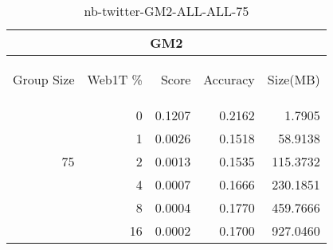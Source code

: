 \begin{center}
\begin{table}[htbp]
\begin{tabular}{ | r | r | r | r | r |}
\hline
\multicolumn{5}{|c|}{GM2}\\
\hline
\begin{sideways}Group Size\end{sideways} & \begin{sideways}Web1T \%\end{sideways} & \begin{sideways}Score\end{sideways} & \begin{sideways}Accuracy\end{sideways} & \begin{sideways}Size(MB)\end{sideways}\\
\hline
\multirow{5}{*}{75}
 & 0 & 0.1207 & 0.2162 & 1.7905\\ \cline{2-5}
 & 1 & 0.0026 & 0.1518 & 58.9138\\ \cline{2-5}
 & 2 & 0.0013 & 0.1535 & 115.3732\\ \cline{2-5}
 & 4 & 0.0007 & 0.1666 & 230.1851\\ \cline{2-5}
 & 8 & 0.0004 & 0.1770 & 459.7666\\ \cline{2-5}
 & 16 & 0.0002 & 0.1700 & 927.0460\\ \cline{2-5}
\hline
\end{tabular}
\caption{nb-twitter-GM2-ALL-ALL-75}
\label{table:nb-twitter-GM2-ALL-ALL-75}
\end{table}
\end{center}

